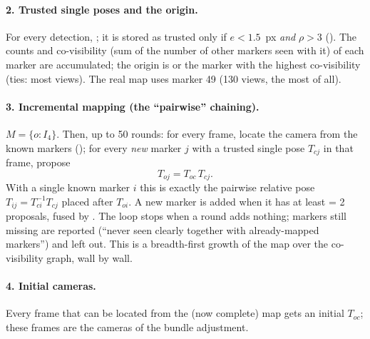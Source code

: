 \paragraph{2. Trusted single poses and the origin.} For every detection, ; it is stored as
trusted only if $e < 1.5$~px \emph{and} $\rho > 3$ (). The counts and co-visibility (sum of the
number of other markers seen with it) of each marker are accumulated; the origin is  or the marker
with the highest co-visibility (ties: most views). The real map uses marker 49 (130 views, the most of all).

\paragraph{3. Incremental mapping (the ``pairwise'' chaining).} $M = \lbrace o: I_4\rbrace$. Then, up to 50
rounds: for every frame, locate the camera from the known markers (); for every
\emph{new} marker $j$ with a trusted single pose $T_{cj}$ in that frame, propose
\[
T_{oj} = T_{oc}\, T_{cj}.
\]
With a single known marker $i$ this is exactly the pairwise relative pose $T_{ij} = T_{ci}^{-1} T_{cj}$ placed after
$T_{oi}$. A new marker is added when it has at least  = 2 proposals, fused by
. The loop stops when a round adds nothing; markers still missing are reported (``never seen
clearly together with already-mapped markers'') and left out. This is a breadth-first growth of the map over the
co-visibility graph, wall by wall.

\paragraph{4. Initial cameras.} Every frame that can be located from the (now complete) map gets an initial
$T_{oc}$; these frames are the cameras of the bundle adjustment.

